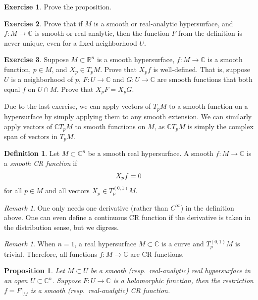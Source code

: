 \documentclass[12pt,openany]{book}
\newcommand{\avoidbreak}{\postdisplaypenalty=100}
\newcommand{\C}{{\mathbb{C}}}
\newcommand{\R}{{\mathbb{R}}}
\newcommand{\myindex}[1]{#1\index{#1}}
\theoremstyle{plain}
\newtheorem{prop}[thm]{Proposition}
\theoremstyle{remark}
\newtheorem{remark}[thm]{Remark}
\theoremstyle{definition}
\newtheorem{defn}[thm]{Definition}
\newenvironment{exbox}{%
    \def\FrameCommand{\vrule width 1pt \relax\hspace{10pt}}%
    \MakeFramed{\advance\hsize-\width\FrameRestore}%
}{%
    \endMakeFramed
}
\theoremstyle{exercise}
\newtheorem{exercise}{Exercise}[section]
\theoremstyle{example}
\begin{document}
\begin{exbox}
\begin{exercise}
Prove the proposition.
\end{exercise}

\begin{exercise}
Prove that if $M$ is a smooth or real-analytic
hypersurface, and $f \colon M \to \C$ is smooth or real-analytic, then the function $F$ from the definition is never unique,
even for a fixed neighborhood $U$.
\end{exercise}

\begin{exercise}
Suppose $M \subset \R^n$ is a smooth hypersurface, $f \colon M \to \C$
is a smooth function, $p \in M$, and $X_p \in T_p M$.  Prove that
$X_p f$ is well-defined.
That is, suppose
$U$ is a neighborhood of $p$,
$F \colon U \to \C$ and $G \colon U \to \C$
are smooth functions that both equal $f$ on $U \cap M$.
Prove that
$X_p F = X_p G$.
\end{exercise}
\end{exbox}

Due to the last exercise, we can apply vectors of $T_p M$ to
a smooth function on a hypersurface by simply applying
them to any smooth extension.  We can similarly apply vectors of
$\C T_p M$ to smooth functions on $M$, as
$\C T_p M$ is simply the complex span of vectors in $T_p M$.

\begin{defn}
Let $M \subset \C^n$ be a smooth real hypersurface.
A smooth $f \colon M \to \C$ is a
\emph{\myindex{smooth CR function}} if
\begin{equation*}
X_p f = 0
\avoidbreak
\end{equation*}
for all $p \in M$ and all vectors $X_p \in T^{(0,1)}_p M$.
\end{defn}

\begin{remark}
One only needs one derivative (rather than $C^\infty$) in the definition
above.
One can even
define a continuous CR function if the derivative is taken in the
distribution sense, but we digress.
\end{remark}

\begin{remark}
When $n=1$, a real hypersurface $M \subset \C$ is a curve and $T^{(0,1)}_p M$
is trivial.  Therefore, all functions $f \colon M \to \C$ are CR functions.
\end{remark}

\begin{prop}
Let $M \subset U$ be a smooth (resp.\ real-analytic) real hypersurface in an
open $U
\subset \C^n$.  Suppose $F \colon U \to \C$ is a holomorphic function,
then the restriction $f = F|_M$ is a smooth (resp.\ real-analytic) CR function.
\end{prop}
\end{document}

